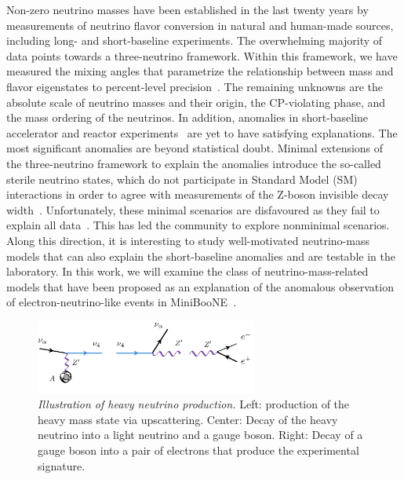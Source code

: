 Non-zero neutrino masses have been established in the last twenty years by measurements of neutrino flavor conversion in natural and human-made sources, including long- and short-baseline experiments. The overwhelming majority of data points towards a three-neutrino framework. Within this framework, we have measured the mixing angles that parametrize the relationship between mass and flavor eigenstates to percent-level precision~\cite{Esteban:2018azc}. The remaining unknowns are the absolute scale of neutrino masses and their origin, the CP-violating phase, and the mass ordering of the neutrinos. In addition, anomalies in short-baseline accelerator and reactor experiments~\cite{Athanassopoulos:1996jb,Aguilar:2001ty,AguilarArevalo:2007it,Aguilar-Arevalo:2018gpe} are yet to have satisfying explanations. The most significant anomalies are beyond statistical doubt. Minimal extensions of the three-neutrino framework to explain the anomalies introduce the so-called sterile neutrino states, which do not participate in Standard Model (SM) interactions in order to agree with measurements of the Z-boson invisible decay width~\cite{ALEPH:2010aa}. Unfortunately, these minimal scenarios are disfavoured as they fail to explain all data~\cite{Collin:2016aqd, Capozzi:2016vac, Dentler:2018sju}. This has led the community to explore nonminimal scenarios. Along this direction, it is interesting to study well-motivated neutrino-mass models that can also explain the short-baseline anomalies and are testable in the laboratory. In this work, we will examine the class of neutrino-mass-related models that have been proposed as an explanation of the anomalous observation of electron-neutrino-like events in MiniBooNE~\cite{Aguilar-Arevalo:2018gpe}.


\begin{figure}[t!]
    \centering
    \includegraphics[width=0.65\textwidth]{MiniBooNE_explanations.pdf}
    \caption[Dark neutrino signal at MiniBooNE.]{{\textit{Illustration of heavy neutrino production.}} Left: production of the heavy mass state via upscattering. Center: Decay of the heavy neutrino into a light neutrino and a gauge boson. Right: Decay of a gauge boson into a pair of electrons that produce the experimental signature.\label{fig:diagram}}
\end{figure}



